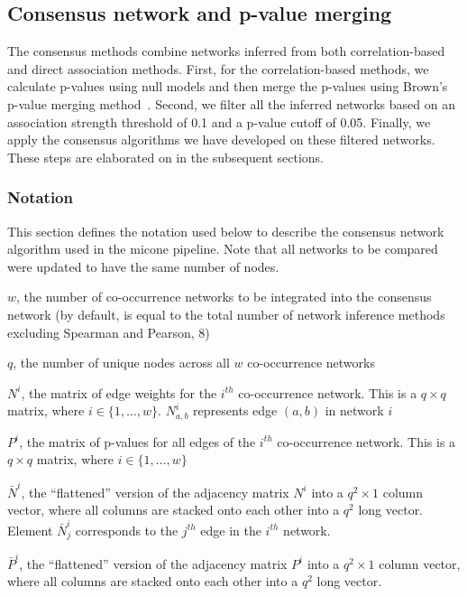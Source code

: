   \subsection*{Consensus network and p-value merging}
  The consensus methods combine networks inferred from both correlation-based and direct association methods.
  First, for the correlation-based methods, we calculate p-values using null models and then merge the p-values using Brown's p-value merging method~\cite{Poole_Gibbs_Shmulevich_Bernard_Knijnenburg_2016,faustCoNetAppInference2016}.
  Second, we filter all the inferred networks based on an association strength threshold of 0.1 and a p-value cutoff of 0.05.
  Finally, we apply the consensus algorithms we have developed on these filtered networks.
  These steps are elaborated on in the subsequent sections.

 \subsubsection*{Notation}
  \vspace{-5mm}
 This section defines the notation used below to describe the consensus network algorithm used in the \ac{micone} pipeline.
 Note that all networks to be compared were updated to have the same number of nodes.

  $w$, the number of co-occurrence networks to be integrated into the consensus network (by default, is equal to the total number of network inference methods excluding Spearman and Pearson, 8)

  $q$, the number of unique nodes across all $w$ co-occurrence networks

  $N^i$, the matrix of edge weights for the $i^{th}$ co-occurrence network.
  This is a $q \times q$ matrix, where $i \in \{1,\dots,w\}$.
  $N^i_{a,b}$ represents edge $(a,b)$ in network $i$

  $P^i$, the matrix of p-values for all edges of the $i^{th}$ co-occurrence network.
  This is a $q \times q$ matrix, where $i \in \{1,\dots,w\}$

  $\bar{N}^i$, the ``flattened'' version of the adjacency matrix $N^i$ into a $q^2 \times 1$ column vector, where all columns are stacked onto each other into a $q^2$ long vector.
  Element $\bar{N}^i_j$ corresponds to the $j^{th}$ edge in the $i^{th}$ network.

  $\bar{P}^i$, the ``flattened'' version of the adjacency matrix $P^i$ into a $q^2 \times 1$ column vector, where all columns are stacked onto each other into a $q^2$ long vector.

